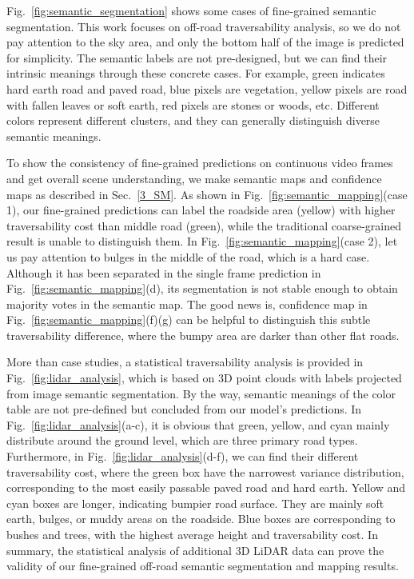 \documentclass[letterpaper, 10 pt, conference]{ieeeconf}  %
\begin{document}
Fig.~\ref{fig:semantic_segmentation} shows some cases of fine-grained semantic segmentation. This work focuses on off-road traversability analysis, so we do not pay attention to the sky area, and only the bottom half of the image is predicted for simplicity. The semantic labels are not pre-designed, but we can find their intrinsic meanings through these concrete cases. For example, green indicates hard earth road and paved road, blue pixels are vegetation, yellow pixels are road with fallen leaves or soft earth, red pixels are stones or woods, etc. Different colors represent different clusters, and they can generally distinguish diverse semantic meanings.

To show the consistency of fine-grained predictions on continuous video frames and get overall scene understanding, we make semantic maps and confidence maps as described in Sec.~\ref{3_SM}. As shown in Fig.~\ref{fig:semantic_mapping}(case 1), our fine-grained predictions can label the roadside area (yellow) with higher traversability cost than middle road (green), while the traditional coarse-grained result is unable to distinguish them. In Fig.~\ref{fig:semantic_mapping}(case 2), let us pay attention to bulges in the middle of the road, which is a hard case. Although it has been separated in the single frame prediction in Fig.~\ref{fig:semantic_mapping}(d), its segmentation is not stable enough to obtain majority votes in the semantic map. The good news is, confidence map in Fig.~\ref{fig:semantic_mapping}(f)(g) can be helpful to distinguish this subtle traversability difference, where the bumpy area are darker than other flat roads.

More than case studies, a statistical traversability analysis is provided in Fig.~\ref{fig:lidar_analysis}, which is based on 3D point clouds with labels projected from image semantic segmentation. By the way, semantic meanings of the color table are not pre-defined but concluded from our model's predictions.
In Fig.~\ref{fig:lidar_analysis}(a-c), it is obvious that green, yellow, and cyan mainly distribute around the ground level, which are three primary road types. Furthermore, in Fig.~\ref{fig:lidar_analysis}(d-f), we can find their different traversability cost, where the green box have the narrowest variance distribution, corresponding to the most easily passable paved road and hard earth. Yellow and cyan boxes are longer, indicating bumpier road surface. They are mainly soft earth, bulges, or muddy areas on the roadside. Blue boxes are corresponding to bushes and trees, with the highest average height and traversability cost. In summary, the statistical analysis of additional 3D LiDAR data can prove the validity of our fine-grained off-road semantic segmentation and mapping results.
\end{document}
